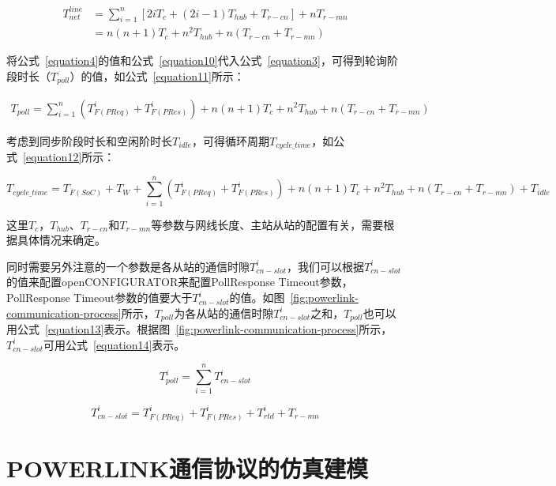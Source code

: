 \begin{equation}
\begin{split}
\label{equation10}
T_{net}^{line}&=\sum_{i=1}^n[2iT_{c}+(2i-1)T_{hub}+T_{r-cn}]+nT_{r-mn}\\
&=n(n+1)T_{c}+n^2T_{hub}+n(T_{r-cn}+T_{r-mn})
\end{split}
\end{equation}

将公式~\ref{equation4}的值和公式~\ref{equation10}代入公式~\ref{equation3}，可得到轮询阶段时长（$T_{poll}$）的值，如公式~\ref{equation11}所示：

\begin{equation}
\begin{split}
\label{equation11}
T_{poll}=\sum_{i=1}^n(T_{F(PReq)}^{i}+T_{F(PRes)}^{i}) + n(n+1)T_{c}+n^2T_{hub}+n(T_{r-cn}+T_{r-mn})
\end{split}
\end{equation}

考虑到同步阶段时长和空闲阶时长$T_{idle}$，可得循环周期$T_{cycle\_time}$，如公式~\ref{equation12}所示：

\begin{equation}
\label{equation12}
T_{cycle\_time}=T_{F(SoC)}+T_{W}+\sum_{i=1}^n(T_{F(PReq)}^{i}+T_{F(PRes)}^{i}) + n(n+1)T_{c}+n^2T_{hub}+ n(T_{r-cn}+T_{r-mn})+T_{idle}
\end{equation}

这里$T_{c}$，$T_{hub}$、$T_{r-cn}$和$T_{r-mn}$等参数与网线长度、主站从站的配置有关，需要根据具体情况来确定。

同时需要另外注意的一个参数是各从站的通信时隙$T_{cn-slot}^{i}$，我们可以根据$T_{cn-slot}^{i}$的值来配置openCONFIGURATOR来配置PollResponse Timeout参数，PollResponse Timeout参数的值要大于$T_{cn-slot}^{i}$的值。如图~\ref{fig:powerlink-communication-process}所示，$T_{poll}$为各从站的通信时隙$T_{cn-slot}^{i}$之和，$T_{poll}$也可以用公式~\ref{equation13}表示。根据图~\ref{fig:powerlink-communication-process}所示，$T_{cn-slot}^{i}$可用公式~\ref{equation14}表示。

\begin{equation}
\label{equation13}
T_{poll}^{i}=\sum_{i=1}^nT_{cn-slot}^{i}
\end{equation}

\begin{equation}
\label{equation14}
T_{cn-slot}^{i}=T_{F(PReq)}^{i}+T_{F(PRes)}^{i}+T_{rtd}^{i}+T_{r-mn}
\end{equation}

\section{POWERLINK通信协议的仿真建模}
\label{section:仿真模拟POWERLINK通信协议}

